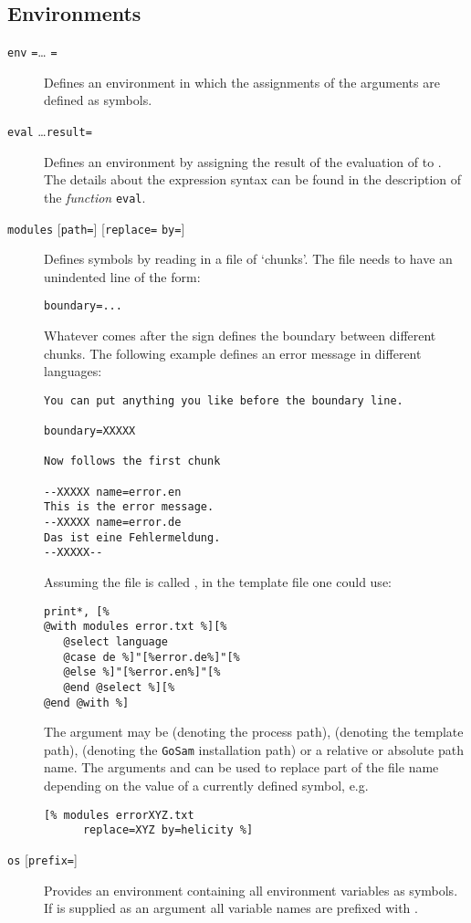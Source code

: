 \documentclass[11pt,a4paper]{refrep}
\newcommand{\golem}{{\tt GoSam}\xspace}
\begin{document}
\subsection{Environments}
\begin{description}
\item[\texttt{env}
   \texttt{=}\dots
   \texttt{=}]
   Defines an environment in which the assignments of the arguments
   are defined as symbols.
\item[\texttt{eval}  \ldots \texttt{result=}]
   Defines an environment by assigning the result of the evaluation of
    to . The details about the expression
   syntax can be found in the description of the \emph{function} \texttt{eval}.
\item[\texttt{modules} 
   {[\texttt{path=}]}
   {[\texttt{replace=} \texttt{by=}]}]
   Defines symbols by reading in a file of `chunks'. The file needs to
   have an unindented line of the form:
\begin{verbatim}
boundary=...
\end{verbatim}
   Whatever comes after the \lit{=} sign defines the boundary between
   different chunks. The following example defines an error message
   in different languages:
\begin{verbatim}
You can put anything you like before the boundary line.

boundary=XXXXX

Now follows the first chunk

--XXXXX name=error.en
This is the error message.
--XXXXX name=error.de
Das ist eine Fehlermeldung.
--XXXXX--
\end{verbatim}
   Assuming the file is called ,
   in the template file one could use:
\begin{lstlisting}
print*, [%
@with modules error.txt %][%
   @select language
   @case de %]"[%error.de%]"[%
   @else %]"[%error.en%]"[%
   @end @select %][%
@end @with %]
\end{lstlisting}
   The argument  may be  (denoting the process path),
    (denoting the template path),
    (denoting the \golem{} installation path) or
   a relative or absolute path name. The arguments  and
    can be used to replace part of the file name
   depending on the value of a currently defined symbol, e.g.
\begin{lstlisting}
[% modules errorXYZ.txt
      replace=XYZ by=helicity %]
\end{lstlisting}
\item[\texttt{os} {[\texttt{prefix=}]}]
   Provides an environment containing all environment variables
   as symbols. If  is supplied as an argument all
   variable names are prefixed with .
\end{description}
\end{document}
